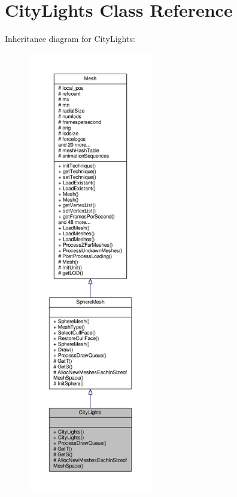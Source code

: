 \hypertarget{classCityLights}{}\section{City\+Lights Class Reference}
\label{classCityLights}


Inheritance diagram for City\+Lights\+:
\nopagebreak
\begin{figure}[H]
\begin{center}
\leavevmode
\includegraphics[height=550pt]{d1/d1c/classCityLights__inherit__graph}
\end{center}
\end{figure}


